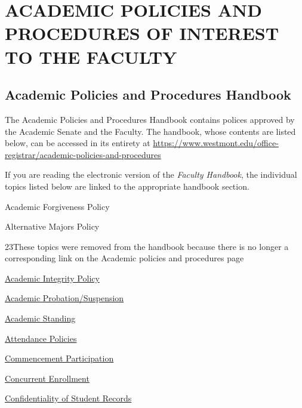 
\section{ACADEMIC POLICIES AND PROCEDURES OF INTEREST TO THE FACULTY}
	\subsection{Academic Policies and Procedures Handbook}

		The Academic Policies and Procedures Handbook contains polices approved by
		the Academic Senate and the Faculty.  The handbook, whose contents are listed
		below, can be accessed in its entirety at
		\href{
			https://www.westmont.edu/office-registrar/academic-policies-and-procedures
		}{
			\url{https://www.westmont.edu/office-registrar/academic-policies-and-procedures}
		}

		If you are reading the electronic version of the \emph{Faculty Handbook}, the individual topics listed below are linked to the appropriate handbook section.
		\change
		{
			Academic Forgiveness Policy

			Alternative Majors Policy

		}
		{23}{These topics were removed from the handbook because there is no longer a corresponding link on the Academic policies and procedures page}


		\href{https://www.westmont.edu/office-provost/academic-program/academic-integrity-policy} {Academic Integrity Policy}

		\href{https://www.westmont.edu/office-registrar/academic-policies-and-procedures/academic-probationsuspension} {Academic Probation/Suspension}

		\href{https://www.westmont.edu/office-registrar/academic-policies-and-procedures/academic-standing} {Academic Standing}

		\href{https://www.westmont.edu/office-registrar/academic-policies-and-procedures/attendance-policies} {Attendance Policies}

		\href{https://www.westmont.edu/office-registrar/academic-policies-and-procedures/commencement-participation} {Commencement Participation}

		\href{https://www.westmont.edu/office-registrar/academic-policies-and-procedures/concurrent-enrollment} {Concurrent Enrollment}

		\href{https://www.westmont.edu/office-registrar/academic-policies-and-procedures/confidentiality-student-records} {Confidentiality of Student Records}

